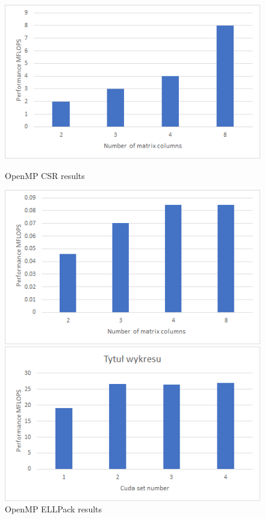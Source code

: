 \documentclass{scrreprt}
\begin{document}
\begin{figure}[ht] 
  \label{ fig7} 
  \begin{minipage}[b]{0.5\linewidth}
    \centering
    \includegraphics[width=.9\linewidth]{adderCSRMP.png} 
    \caption{OpenMP CSR results} 
    \vspace{4ex}
  \end{minipage}%
  \begin{minipage}[b]{0.5\linewidth}
    \centering
    \includegraphics[width=.9\linewidth]{adderEllMP.png} 
    \caption{OpenMP ELLPack results} 
    \vspace{4ex}
  \end{minipage} 
  \begin{minipage}[b]{0.5\linewidth}
    \centering
    \includegraphics[width=.9\linewidth]{adderCSRCUDA.png} 

\end{minipage}
\end{figure}
\end{document}
